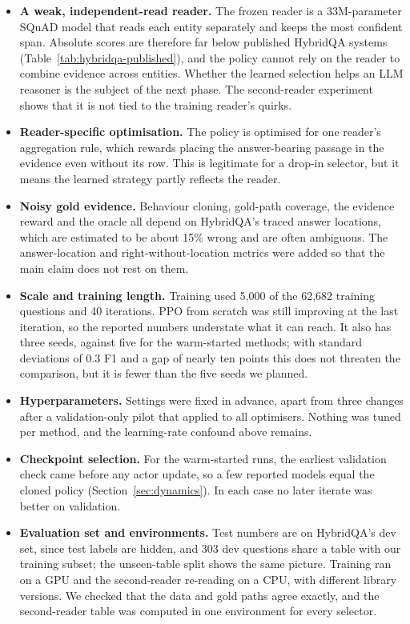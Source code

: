 \begin{itemize}
  \item \textbf{A weak, independent-read reader.} The frozen reader is a 33M-parameter SQuAD model that reads each entity separately and keeps the most confident span. Absolute scores are therefore far below published HybridQA systems (Table~\ref{tab:hybridqa-published}), and the policy cannot rely on the reader to combine evidence across entities. Whether the learned selection helps an LLM reasoner is the subject of the next phase. The second-reader experiment shows that it is not tied to the training reader's quirks.
  \item \textbf{Reader-specific optimisation.} The policy is optimised for one reader's aggregation rule, which rewards placing the answer-bearing passage in the evidence even without its row. This is legitimate for a drop-in selector, but it means the learned strategy partly reflects the reader.
  \item \textbf{Noisy gold evidence.} Behaviour cloning, gold-path coverage, the evidence reward and the oracle all depend on HybridQA's traced answer locations, which are estimated to be about 15\% wrong and are often ambiguous. The answer-location and right-without-location metrics were added so that the main claim does not rest on them.
  \item \textbf{Scale and training length.} Training used 5{,}000 of the 62{,}682 training questions and 40 iterations. PPO from scratch was still improving at the last iteration, so the reported numbers understate what it can reach. It also has three seeds, against five for the warm-started methods; with standard deviations of 0.3 F1 and a gap of nearly ten points this does not threaten the comparison, but it is fewer than the five seeds we planned.
  \item \textbf{Hyperparameters.} Settings were fixed in advance, apart from three changes after a validation-only pilot that applied to all optimisers. Nothing was tuned per method, and the learning-rate confound above remains.
  \item \textbf{Checkpoint selection.} For the warm-started runs, the earliest validation check came before any actor update, so a few reported models equal the cloned policy (Section~\ref{sec:dynamics}). In each case no later iterate was better on validation.
  \item \textbf{Evaluation set and environments.} Test numbers are on HybridQA's dev set, since test labels are hidden, and 303 dev questions share a table with our training subset; the unseen-table split shows the same picture. Training ran on a GPU and the second-reader re-reading on a CPU, with different library versions. We checked that the data and gold paths agree exactly, and the second-reader table was computed in one environment for every selector.
\end{itemize}

